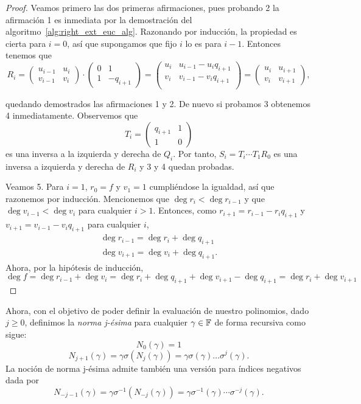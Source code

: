 \begin{proof}
Veamos primero las dos primeras afirmaciones, pues probando 2 la afirmación 1 es inmediata por la demostración del algoritmo~\ref{alg:right_ext_euc_alg}. Razonando por inducción, la propiedad es cierta para \(i = 0\), así que supongamos que fijo \(i\) lo es para  \(i-1\). Entonces tenemos que
\[
R_i =
\begin{pmatrix}
    u_{i-1} & u_{i} \\
    v_{i-1} & v_{i}
\end{pmatrix}
\cdot
\begin{pmatrix}
    0 & 1 \\
    1 & -q_{i+1}
\end{pmatrix}
=
\begin{pmatrix}
    u_i & u_{i-1} - u_{i}q_{i+1} \\
    v_i & v_{i-1} - v_{i}q_{i+1} \\
\end{pmatrix}
=
\begin{pmatrix}
    u_{i} & u_{i+1} \\
    v_{i} & v_{i+1}
\end{pmatrix}
,\]

quedando demostrados las afirmaciones 1 y 2. De nuevo si probamos 3 obtenemos 4 inmediatamente. Observemos que \[T_i =
\begin{pmatrix}
q_{i+1} & 1 \\
1 & 0
\end{pmatrix} \]
es una inversa a la izquierda y derecha de \(Q_i\). Por tanto, \(S_i = T_i \cdots T_1 R_0\) es una inversa a izquierda y derecha de \(R_i\) y 3 y 4 quedan probadas.

Veamos 5. Para \(i = 1\),  \(r_0 = f\) y  \(v_1 = 1\) cumpliéndose la igualdad, así que razonemos por inducción. Mencionemos que \(\deg r_i < \deg r_{i-1}\) y que \(\deg v_{i-1} < \deg v_i\) para cualquier \(i > 1\). Entonces, como \(r_{i+1} = r_{i-1} - r_{i}q_{i+1}\) y \(v_{i+1} = v_{i-1} - v_{i}q_{i+1} \) para cualquier \(i\),
 \[
\begin{aligned}
    \deg r_{i-1} = \deg r_{i} + \deg q_{i+1} \\
    \deg v_{i+1} = \deg v_i + \deg q_{i+1}.
\end{aligned}
\]
Ahora, por la hipótesis de inducción, \(\deg f = \deg r_{i-1} + \deg v_{i} = \deg r_{i} + \deg q_{i+1} + \deg v_{i+1} - \deg q_{i+1} = \deg r_i + \deg v_{i+1}\)
\end{proof}

Ahora, con el objetivo de poder definir la evaluación de nuestro polinomios, dado \(j \geq 0\), definimos la \textit{norma j-ésima} para cualquier \(\gamma \in \mathbb{F}\) de forma recursiva como sigue:
\[
N_0(\gamma) = 1
\]
\[
N_{j+1}(\gamma) = \gamma \sigma(N_{j}(\gamma)) = \gamma \sigma(\gamma)\dots\sigma^{j}(\gamma)
.\]
La noción de norma j-ésima admite también una versión para índices negativos dada por
\[
N_{-j-1}(\gamma) = \gamma \sigma^{-1}(N_{-j}(\gamma)) =  \gamma \sigma^{-1}(\gamma) \cdots \sigma^{-j}(\gamma)
.\]

